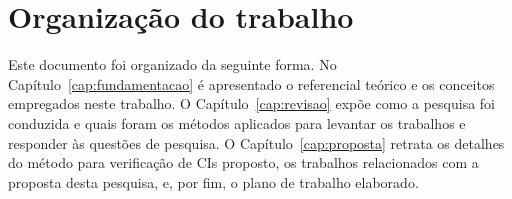\section{Organização do trabalho}

Este documento foi organizado da seguinte forma. No Capítulo~\ref{cap:fundamentacao} é apresentado o referencial teórico e os conceitos empregados neste trabalho. O Capítulo~\ref{cap:revisao} expõe como a pesquisa foi conduzida e quais foram os métodos aplicados para levantar os trabalhos e responder às questões de pesquisa. O Capítulo~\ref{cap:proposta} retrata os detalhes do método para verificação de CIs proposto, os trabalhos relacionados com a proposta desta pesquisa, e, por fim, o plano de trabalho elaborado. 

